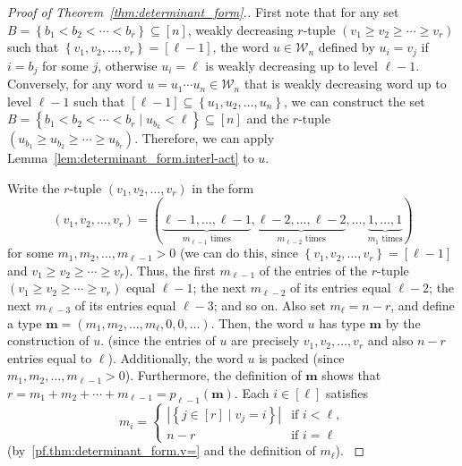 \documentclass[reqno]{amsart}
\newcommand{\0}{\phantom{c}}
\newcommand{\mm}{\mathbf{m}}
\newcommand{\mcW}{\mathcal{W}}
\newenvironment{verlong}{}{}
\newenvironment{vershort}{}{}
\newcommand{\set}[1]{\left\{ #1 \right\}}
\newcommand{\abs}[1]{\left| #1 \right|}
\newcommand{\tup}[1]{\left( #1 \right)}
\newcommand{\ive}[1]{\left[ #1 \right]}
\theoremstyle{plain}
\theoremstyle{definition}
\numberwithin{equation}{section}
\begin{document}
\begin{proof}[Proof of Theorem~\ref{thm:determinant_form}.]
First note that for any set $B = \set{ b_1 < b_2 < \cdots < b_r }  \subseteq \ive{n}$, weakly decreasing $r$-tuple $\tup{v_1 \geq v_2 \geq \dotsm \geq v_r}$ such that $\set{ v_1, v_2, \dotsc, v_r } = \ive{\ell-1}$, the word $u \in \mcW_n$ defined by $u_i = v_j$ if $i = b_j$ for some $j$, otherwise $u_i = \ell$ is weakly decreasing up to level $\ell-1$.
Conversely, for any word $u = u_1 \dotsm u_n \in \mcW_n$ that is weakly decreasing word up to level $\ell-1$ such that $\ive{\ell-1} \subseteq \set{u_1, u_2, \dotsc, u_n}$, we can construct the set $B = \set{ b_1 < b_2 < \cdots < b_r \mid u_{b_k} < \ell} \subseteq \ive{n}$ and the $r$-tuple $\tup{u_{b_1} \geq u_{b_2} \geq \cdots \geq u_{b_r}}$.
Therefore, we can apply Lemma~\ref{lem:determinant_form.interl-act} to $u$.

Write the $r$-tuple $\tup{v_1, v_2, \dotsc, v_r}$ in the form
\begin{equation}
\label{pf.thm:determinant_form.v=}
\tup{v_1, v_2, \dotsc, v_r} = (
  \underbrace{\ell-1,\ldots,\ell-1}_{m_{\ell-1}\text{ times}},
  \underbrace{\ell-2,\ldots,\ell-2}_{m_{\ell-2}\text{ times}},
  \dotsc,
  \underbrace{1,\ldots,1}_{m_1\text{ times}}
)
\end{equation}
for some $m_1, m_2, \ldots, m_{\ell-1} > 0$
(we can do this, since $\set{v_1, v_2, \dotsc, v_r} = \ive{\ell-1}$ and $v_1 \geq v_2 \geq \cdots \geq v_r$).
\begin{verlong}
Thus, the first $m_{\ell-1}$ of the entries of the $r$-tuple $\tup{v_1 \geq v_2 \geq \cdots \geq v_r}$ equal $\ell-1$; the next $m_{\ell-2}$ of its entries equal $\ell-2$; the next $m_{\ell-3}$ of its entries equal $\ell-3$; and so on.
\end{verlong}
Also set $m_{\ell} = n - r$, and define a type $\mm = \tup{m_1, m_2, \dotsc, m_{\ell}, 0, 0, \ldots}$.
Then, the word $u$ has type $\mm$
\begin{vershort}
by the construction of $u$.
\end{vershort}
\begin{verlong}
(since the entries of $u$ are precisely $v_1, v_2, \dotsc, v_r$ and also $n-r$ entries equal to $\ell$).
\end{verlong}
Additionally, the word $u$ is packed (since $m_1, m_2, \ldots, m_{\ell-1} > 0$).
Furthermore, the definition of $\mm$ shows that $r = m_1 + m_2 + \cdots + m_{\ell-1} = p_{\ell-1}(\mm)$.
\begin{verlong}
Each $i \in \ive{\ell}$ satisfies
\[
m_i =
  \begin{cases}
  \abs{ \set{ j \in \ive{r} \mid v_j = i}} & \text{if } i < \ell,\\
  n - r & \text{if } i = \ell
  \end{cases}
\]
(by~\eqref{pf.thm:determinant_form.v=} and the definition of $m_{\ell}$).
\end{verlong}


\end{proof}
\end{document}
